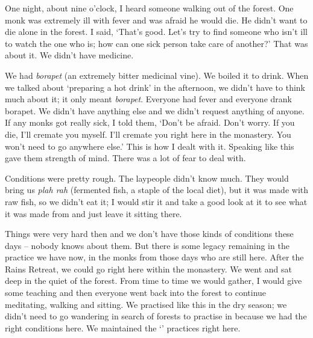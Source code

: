 One night, about nine o'clock, I heard someone walking out of the forest. One monk was extremely ill with fever and was afraid he would die. He didn't want to die alone in the forest. I said, `That's good. Let's try to find someone who isn't ill to watch the one who is; how can one sick person take care of another?' That was about it. We didn't have medicine. 

We had \textit{borapet} (an extremely bitter medicinal vine). We boiled it to drink. When we talked about `preparing a hot drink' in the afternoon, we didn't have to think much about it; it only meant \textit{borapet}. Everyone had fever and everyone drank borapet. We didn't have anything else and we didn't request anything of anyone. If any monks got really sick, I told them, `Don't be afraid. Don't worry. If you die, I'll cremate you myself. I'll cremate you right here in the monastery. You won't need to go anywhere else.' This is how I dealt with it. Speaking like this gave them strength of mind. There was a lot of fear to deal with. 

Conditions were pretty rough. The laypeople didn't know much. They would bring us \textit{plah rah} (fermented fish, a staple of the local diet), but it was made with raw fish, so we didn't eat it; I would stir it and take a good look at it to see what it was made from and just leave it sitting there. 

Things were very hard then and we don't have those kinds of conditions these days -- nobody knows about them. But there is some legacy remaining in the practice we have now, in the monks from those days who are still here. After the Rains Retreat, we could go  right here within the monastery. We went and sat deep in the quiet of the forest. From time to time we would gather, I would give some teaching and then everyone went back into the forest to continue meditating, walking and sitting. We practised like this in the dry season; we didn't need to go wandering in search of forests to practise in because we had the right conditions here. We maintained the `' practices right here. 

